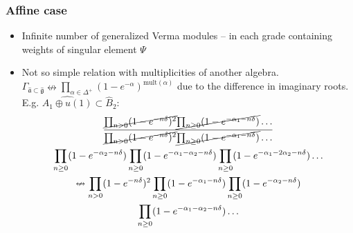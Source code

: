 \documentclass[pdftex]{beamer}
\newcommand{\gfh}{\hat{\mathfrak{g}}}
\newcommand{\afh}{\hat{\mathfrak{a}}}
\theoremstyle{definition} \newtheorem{Def}{Definition}
\begin{document}
\begin{frame}
  \frametitle{Affine case}
  \begin{itemize}
  \item Infinite number of generalized Verma modules -- in each grade containing weights of singular element $\Psi$
  \item Not so simple relation with multiplicities of another algebra.\\
     $\Gamma_{\afh\subset \gfh}\nleftrightarrow \prod_{\alpha\in \Delta^{+}}\left(1-e^{-\alpha}\right)^{\mathrm{mult}(\alpha)}$ due to the difference in imaginary roots. E.g. $\widehat{A_{1}\oplus u(1)}\subset \hat B_{2}$:
    \begin{multline*}
      \frac{\cancel{\prod_{n>0} (1-e^{-n\delta})^{2}} \cancel{\prod_{n\geq 0}(1-e^{-\alpha_{1}-n\delta})}\dots }{\cancel{\prod_{n>0} (1-e^{-n\delta})^{2}} \cancel{\prod_{n\geq 0}(1-e^{-\alpha_{1}-n\delta})}\dots}\\ 
      \prod_{n\geq 0}(1-e^{-\alpha_{2}-n\delta}) 
        \prod_{n\geq 0}(1-e^{-\alpha_{1}-\alpha_{2}-n\delta}) \prod_{n\geq 0}(1-e^{-\alpha_{1}-2\alpha_{2}-n\delta}) \dots\\
        \nleftrightarrow \prod_{n>0} (1-e^{-n\delta})^{2} \prod_{n\geq 0}(1-e^{-\alpha_{1}-n\delta}) 
        \prod_{n\geq 0}(1-e^{-\alpha_{2}-n\delta})\\ \prod_{n\geq 0}(1-e^{-\alpha_{1}-\alpha_{2}-n\delta}) \dots
    \end{multline*}
  \end{itemize}
\end{frame}
\end{document}
